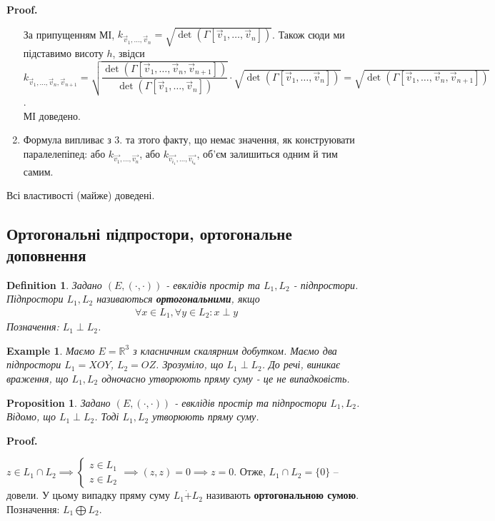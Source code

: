 \documentclass[a4paper, 10pt]{article}
\makeatletter
\theoremstyle{theoremdd}
\newtheorem{definition}[theorem]{Definition}
\newtheorem{example}[theorem]{Example}
\newtheorem{proposition}[theorem]{Proposition}
\renewenvironment{proof}[1][Proof.\\]{\par
\pushQED{\hfill \qed}%
\normalfont \topsep6\p@\@plus6\p@\relax
\trivlist
\item\relax
{\bfseries
#1\@addpunct{.}}\hspace\labelsep\ignorespaces
}{%
\popQED\endtrivlist\@endpefalse
}
\makeatother
\begin{document}
\begin{proof}
\begin{enumerate}[wide=0pt, label={\arabic*)},topsep=-\parskip]
За припущенням МІ, $k_{\vec{v}_1,\dots,\vec{v}_n} = \sqrt{\det(\Gamma[\vec{v}_1,\dots,\vec{v}_n])}$. Також сюди ми підставимо висоту $h$, звідси\\
$k_{\vec{v}_1,\dots,\vec{v}_n,\vec{v}_{n+1}} = \sqrt{\dfrac{\det(\Gamma[\vec{v}_1,\dots,\vec{v}_n,\vec{v}_{n+1}])}{\det(\Gamma[\vec{v}_1,\dots,\vec{v}_n])}} \cdot \sqrt{\det(\Gamma[\vec{v}_1,\dots,\vec{v}_n])} = \sqrt{\det(\Gamma[\vec{v}_1,\dots,\vec{v}_n, \vec{v}_{n+1}])}$.\\
МІ доведено.
\item Формула випливає з 3. та зтого факту, що немає значення, як конструювати паралелепіпед: або $k_{\vec{v_1},\dots,\vec{v_n}}$, або $k_{\vec{v_{i_1}},\dots,\vec{v_{i_n}}}$, об'єм залишиться одним й тим самим.\\
\end{enumerate}
Всі властивості (майже) доведені.
\end{proof}

\subsection{Ортогональні підпростори, ортогональне доповнення}
\begin{definition}
Задано $(E, (\cdot,\cdot))$ - евклідів простір та $L_1,L_2$ - підпростори.\\
Підпростори $L_1,L_2$ називаються \textbf{ортогональними}, якщо
\begin{align*}
\forall x \in L_1, \forall y \in L_2: x \perp y
\end{align*}
Позначення: $L_1 \perp L_2$.
\end{definition}

\begin{example}
Маємо $E = \mathbb{R}^3$  з класничним скалярним добутком. Маємо два підпростори $L_1 = XOY$, $L_2 = OZ$. Зрозуміло, що $L_1 \perp L_2$. До речі, виникає враження, що $L_1,L_2$ одночасно утворюють пряму суму - це не випадковість.
\end{example}

\begin{proposition}
Задано $(E,(\cdot,\cdot))$ - евклідів простір та підпростори $L_1,L_2$. Відомо, що $L_1 \perp L_2$. Тоді $L_1, L_2$ утворюють пряму суму.
\end{proposition}

\begin{proof}
$z \in L_1 \cap L_2 \implies \begin{cases} z \in L_1 \\ z \in L_2 \end{cases} \implies (z,z) = 0 \implies z = 0$. Отже, $L_1 \cap L_2 = \{0\}$ -- довели.
\end{proof}
\noindent
У цьому випадку пряму суму $L_1 \dot{+} L_2$ називають \textbf{ортогональною сумою}.\\
Позначення: $L_1 \bigoplus L_2$.
\end{document}
